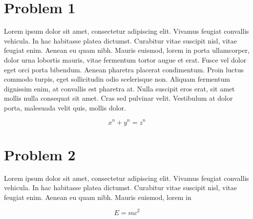 \documentclass{article}
\date{\today}
\begin{document}
\makecover

\section*{Problem 1}
Lorem ipsum dolor sit amet, consectetur adipiscing elit. Vivamus feugiat convallis vehicula. In hac habitasse platea dictumst. Curabitur vitae suscipit nisl, vitae feugiat enim. Aenean eu quam nibh. Mauris euismod, lorem in porta ullamcorper, dolor urna lobortis mauris, vitae fermentum tortor augue et erat. Fusce vel dolor eget orci porta bibendum. Aenean pharetra placerat condimentum. Proin luctus commodo turpis, eget sollicitudin odio scelerisque non. Aliquam fermentum dignissim enim, at convallis est pharetra at. Nulla suscipit eros erat, sit amet mollis nulla consequat sit amet. Cras sed pulvinar velit. Vestibulum at dolor porta, malesuada velit quis, mollis dolor.

\[ x^n + y^n = z^n \]

\section*{Problem 2}
Lorem ipsum dolor sit amet, consectetur adipiscing elit. Vivamus feugiat convallis vehicula. In hac habitasse platea dictumst. Curabitur vitae suscipit nisl, vitae feugiat enim. Aenean eu quam nibh. Mauris euismod, lorem in

\[E=mc^2\]
\end{document}
